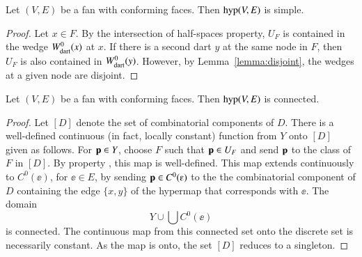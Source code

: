 \begin{lemma}  
Let $(V,E)$ be a fan with conforming faces.  
Then ${\operatorname{hyp}}(V,E)$ is simple.
\end{lemma}
%

\begin{proof}  Let $x\in F$.  By the intersection of half-spaces property, $U_F$ is contained in the wedge $W^0_{\text{dart}}(x)$ at $x$.  If there is a second dart $y$ at the same node in $F$, then $U_F$ is also contained in $W^0_{\text{dart}}(y)$. However, by Lemma~\ref{lemma:disjoint}, the wedges at a given node are disjoint.
\end{proof}

\begin{lemma}  
Let $(V,E)$ be a fan with conforming faces.  
Then ${\operatorname{hyp}}(V,E)$ is connected.
\end{lemma}
%
%
%


\begin{proof}  Let $[D]$ denote the set of combinatorial components of $D$.
There is a well-defined continuous (in fact, locally constant) function from $Y$ onto $[D]$ given as follows.  For ${\mathbf p}\in Y$, choose $F$ such that ${\mathbf p}\in U_F$ and send ${\mathbf p}$ to the class of $F$ in $[D]$.  By property , this map is well-defined. This map extends continuously to $C^0(\ee)$, for $\ee\in E$, by sending $\p\in C^0(\ee)$ to the the combinatorial component of $D$ containing the edge $\{x,y\}$ of the hypermap that corresponds with $\ee$.  The domain
$$
Y\cup \bigcup C^0(\ee)
$$
is connected.  The continuous map from this connected set onto the discrete set is necessarily constant.  As the map is onto, the set $[D]$ reduces to a singleton.
\end{proof}

